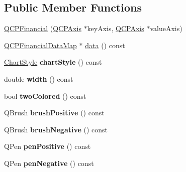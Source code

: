 \subsection*{Public Member Functions}
\begin{DoxyCompactItemize}
\item 
\hyperlink{classQCPFinancial_a4702d5248feeb9d1ec6e3ce725b10b32}{Q\+C\+P\+Financial} (\hyperlink{classQCPAxis}{Q\+C\+P\+Axis} $\ast$key\+Axis, \hyperlink{classQCPAxis}{Q\+C\+P\+Axis} $\ast$value\+Axis)
\item 
\hyperlink{qcustomplot_8h_a745c09823fae0974b50beca9bc3b3d7d}{Q\+C\+P\+Financial\+Data\+Map} $\ast$ \hyperlink{classQCPFinancial_a58e05aefa057d16edfcc0334cf81c241}{data} () const 
\item 
\hypertarget{classQCPFinancial_a0888c9308cc5fcb4daa70184f9582412}{}\hyperlink{classQCPFinancial_a0f800e21ee98d646dfc6f8f89d10ebfb}{Chart\+Style} {\bfseries chart\+Style} () const \label{classQCPFinancial_a0888c9308cc5fcb4daa70184f9582412}

\item 
\hypertarget{classQCPFinancial_a71ccaa04cdade0ec08a2117db6e4a4ce}{}double {\bfseries width} () const \label{classQCPFinancial_a71ccaa04cdade0ec08a2117db6e4a4ce}

\item 
\hypertarget{classQCPFinancial_a2bab30fc4eee38a0da3a05846b8d7ac7}{}bool {\bfseries two\+Colored} () const \label{classQCPFinancial_a2bab30fc4eee38a0da3a05846b8d7ac7}

\item 
\hypertarget{classQCPFinancial_acb69536a334fae7fc31b2bfd4eca81f5}{}Q\+Brush {\bfseries brush\+Positive} () const \label{classQCPFinancial_acb69536a334fae7fc31b2bfd4eca81f5}

\item 
\hypertarget{classQCPFinancial_a91e09b31ce341c17b917e77fdc68d84e}{}Q\+Brush {\bfseries brush\+Negative} () const \label{classQCPFinancial_a91e09b31ce341c17b917e77fdc68d84e}

\item 
\hypertarget{classQCPFinancial_a544899bde79d06e17ccefcb9926d87ce}{}Q\+Pen {\bfseries pen\+Positive} () const \label{classQCPFinancial_a544899bde79d06e17ccefcb9926d87ce}

\item 
\hypertarget{classQCPFinancial_a557fe911aa04f70c1734c8fa09994148}{}Q\+Pen {\bfseries pen\+Negative} () const \label{classQCPFinancial_a557fe911aa04f70c1734c8fa09994148}


\end{DoxyCompactItemize}
